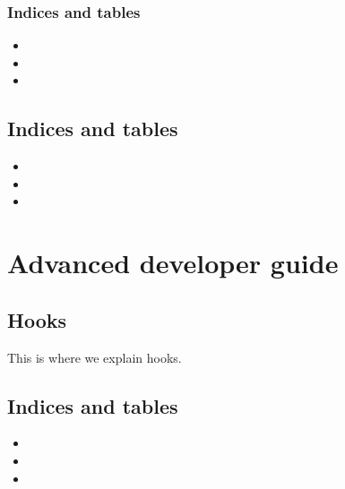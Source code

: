 \documentclass[letterpaper,10pt,english]{sphinxmanual}
\begin{document}
\subsection{Indices and tables}
\label{\detokenize{inputs/inputs_csv:indices-and-tables}}\begin{itemize}
\item {} 

\item {} 

\item {} 

\end{itemize}


\section{Indices and tables}
\label{\detokenize{inputs/index:indices-and-tables}}\begin{itemize}
\item {} 

\item {} 

\item {} 

\end{itemize}


\chapter{Advanced developer guide}
\label{\detokenize{advanced-guide/index:advanced-developer-guide}}\label{\detokenize{advanced-guide/index::doc}}

\section{Hooks}
\label{\detokenize{advanced-guide/hooks:hooks}}\label{\detokenize{advanced-guide/hooks::doc}}
This is where we explain hooks.


\section{Indices and tables}
\label{\detokenize{advanced-guide/index:indices-and-tables}}\begin{itemize}
\item {} 

\item {} 

\item {} 

\end{itemize}
\end{document}
